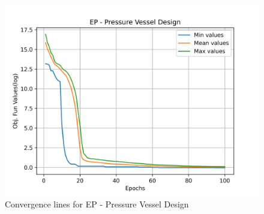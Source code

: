 \begin{figure}[H]
\centering
\caption{Convergence lines for EP - Pressure Vessel Design}
\label{fig:pressure_vessel_problem_solve_ep}
\includegraphics[scale=0.5]{images/pressure_vessel_problem_solve_ep.png}
\end{figure}
        
